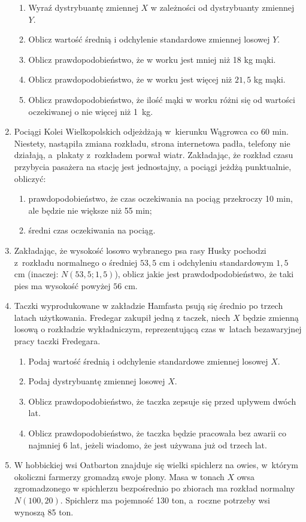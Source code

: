 \documentclass{mwart}
\newcommand{\ans}[1]{}
\newcommand{\ans}[1]{\emph{Odpowiedź:} #1}
\begin{document}
\begin{enumerate}
\begin{enumerate}
\item Wyraź dystrybuantę zmiennej $X$ w zależności od dystrybuanty zmiennej $Y$. \ans{$F_X(x)=F_Y(\frac{x-20}{2})$}
\item Oblicz wartość średnią i odchylenie standardowe zmiennej losowej $Y$.
\item Oblicz prawdopodobieństwo, że w worku jest mniej niż 18 kg mąki. \ans{$P(X<18)=F_X(18)=F_Y(-1)=1-F_Y(1)=1-0{,}8413\approx 0{,}16$}
\item Oblicz prawdopodobieństwo, że w worku jest więcej niż $21{,}5$ kg mąki. \ans{$P(X>21{,}5)=1-F_X(21{,}5)=1-F_Y(0{,}75)=1-0{,}7734\approx 0{,}23$}
\item Oblicz prawdopodobieństwo, że ilość mąki w worku różni się od wartości oczekiwanej o nie więcej niż 1~kg. \ans{$P(19<X<21)=F_X(21)-F_X(19)=F_Y(0{,}5)-F_Y(-0{,}5)=2F_Y(0{,}5)-1=2\cdot0{,}6915-1=0{,}38$}
\end{enumerate}
\item Pociągi Kolei Wielkopolskich odjeżdżają w~kierunku Wągrowca co 60 min. Niestety, nastąpiła zmiana rozkładu, strona
internetowa padła, telefony nie działają, a~plakaty z~rozkładem porwał wiatr. Zakładając, że rozkład czasu przybycia pasażera na stację jest
jednostajny, a pociągi jeżdżą punktualnie, obliczyć:
\begin{enumerate}
	\item prawdopodobieństwo, że czas oczekiwania na pociąg przekroczy 10 min, ale będzie nie większe niż 55 min;
	\item średni czas oczekiwania na pociąg.
\end{enumerate}
\item Zakładając, że wysokość losowo wybranego psa rasy Husky pochodzi z~rozkładu normalnego o średniej $53{,}5$ cm i odchyleniu standardowym $1{,}5$ cm (inaczej: $N(53{,}5;1{,}5)$), oblicz jakie jest prawdodpodobieństwo, że taki pies ma wysokość powyżej $56$ cm.
\item Taczki wyprodukowane w zakładzie Hamfasta psują się średnio po trzech latach użytkowania.
Fredegar zakupił jedną z taczek, niech $X$ będzie zmienną losową o rozkładzie wykładniczym, reprezentującą czas w~latach bezawaryjnej pracy taczki Fredegara.

\begin{enumerate}
\item Podaj wartość średnią i odchylenie standardowe zmiennej losowej $X$.
\item Podaj dystrybuantę zmiennej losowej $X$.
\item Oblicz prawdopodobieństwo, że taczka zepsuje się przed upływem dwóch lat. 
\item Oblicz prawdopodobieństwo, że taczka będzie pracowała bez awarii co najmniej 6 lat, jeżeli wiadomo, że jest używana już od trzech lat.
\end{enumerate}
\item W hobbickiej wsi Oatbarton znajduje się wielki spichlerz na owies, w~którym okoliczni farmerzy gromadzą swoje plony.
Masa w tonach $X$ owsa zgromadzonego w spichlerzu bezpośrednio po zbiorach ma rozkład normalny $N(100, 20)$.
Spichlerz ma pojemność 130 ton, a~roczne potrzeby wsi wynoszą 85 ton.


\end{enumerate}
\end{document}
